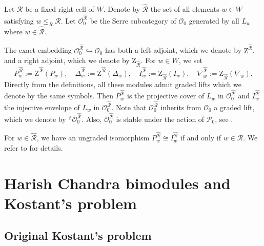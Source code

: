 \documentclass[a4paper]{amsart}
\def\HK#1{\textcolor[rgb]{.75,0.00,0.00}{[HK: #1]}}
\begin{document}
Let $\mathcal{R}$ be a fixed right cell of $W$.
Denote by $\hat{\mathcal{R}}$ the set of all 
elements $w\in W$ satisfying $w\leq_R \mathcal{R}$.
Let $\mathcal{O}^{\hat{\mathcal{R}}}_0$ be the Serre subcategory
of $\mathcal{O}_0$ generated by all $L_w$ where 
$w\in \hat{\mathcal{R}}$.

The exact embedding $\mathcal{O}^{\hat{\mathcal{R}}}_0\hookrightarrow
\mathcal{O}_0$ has both a left adjoint, which we denote by
$\mathrm{Z}^{\hat{\mathcal{R}}}$, and a right adjoint, 
which we denote by $\mathrm{Z}_{\hat{\mathcal{R}}}$.
For $w\in W$, we set 
\begin{displaymath}
P^{\hat{\mathcal{R}}}_w:=\mathrm{Z}^{\hat{\mathcal{R}}}(P_w),\quad
\Delta^{\hat{\mathcal{R}}}_w:=\mathrm{Z}^{\hat{\mathcal{R}}}(\Delta_w),\quad
I^{\hat{\mathcal{R}}}_w:=\mathrm{Z}_{\hat{\mathcal{R}}}(I_w),\quad
\nabla^{\hat{\mathcal{R}}}_w:=\mathrm{Z}_{\hat{\mathcal{R}}}(\nabla_w).
\end{displaymath}
Directly from the definitions, all these modules admit graded lifts
which we denote by the same symbols.
Then $P^{\hat{\mathcal{R}}}_w$ is the projective cover of 
$L_w$  in $\mathcal{O}^{\hat{\mathcal{R}}}_0$
and  $I^{\hat{\mathcal{R}}}_w$ the injective envelope of 
$L_w$ in $\mathcal{O}^{\hat{\mathcal{R}}}_0$. 
Note that $\mathcal{O}^{\hat{\mathcal{R}}}_0$ inherits from 
$\mathcal{O}_0$ a graded lift, which we denote by 
${}^\mathbb{Z}\mathcal{O}^{\hat{\mathcal{R}}}_0$.
Also, $\mathcal{O}^{\hat{\mathcal{R}}}_0$ is stable under the action of
$\mathscr{P}_0$, see \cite[Lemma~13]{MM1}.

For $w\in \hat{\mathcal{R}}$, we have an ungraded isomorphism
$P^{\hat{\mathcal{R}}}_w\cong I^{\hat{\mathcal{R}}}_w$
if and only if $w\in \mathcal{R}$.
We refer to \cite{MS,Ma2} for details.



\section{Harish Chandra bimodules and Kostant's problem}\label{s3}

\subsection{Original Kostant's problem}\label{s3.1}
\end{document}
